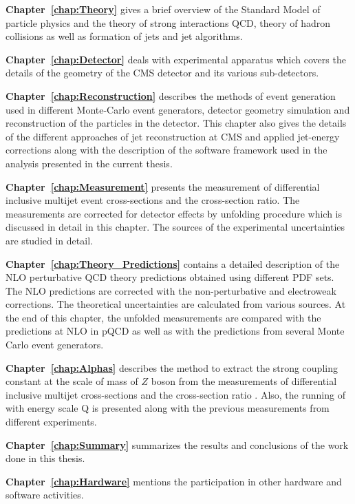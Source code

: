 {\bf Chapter~\ref{chap:Theory}} gives a brief overview of the Standard Model of particle physics and the theory of strong interactions QCD, theory of hadron collisions as well as formation of jets and jet algorithms. 

{\bf Chapter~\ref{chap:Detector}} deals with experimental apparatus which covers the details of the geometry of the CMS detector and its various sub-detectors.

{\bf Chapter~\ref{chap:Reconstruction}} describes the methods of event generation used in different Monte-Carlo event generators, detector geometry simulation and reconstruction of the particles in the detector. This chapter also gives the details of the different approaches of jet reconstruction at CMS and applied jet-energy corrections along with the description of the software framework used in the analysis presented in the current thesis.

{\bf Chapter~\ref{chap:Measurement}} presents the measurement of differential inclusive multijet event cross-sections and the cross-section ratio. The measurements are corrected for detector effects by unfolding procedure which is discussed in detail in this chapter. The sources of the experimental uncertainties are studied in detail. 

{\bf Chapter~\ref{chap:Theory_Predictions}} contains a detailed description of the NLO perturbative QCD theory predictions obtained using different PDF sets. The NLO predictions are corrected with the non-perturbative and electroweak corrections. The theoretical uncertainties are calculated from various sources. At the end of this chapter, the unfolded measurements are compared with the predictions at NLO in pQCD as well as with the predictions from several Monte Carlo event generators.

{\bf Chapter~\ref{chap:Alphas}} describes the method to extract the strong coupling constant at the scale of mass of $Z$ boson \alpsmz from the measurements of differential inclusive multijet cross-sections and the cross-section ratio \ratio. Also, the running of \alps with energy scale Q is presented along with the previous measurements from different experiments.

{\bf Chapter~\ref{chap:Summary}} summarizes the results and conclusions of the work done in this thesis.

{\bf Chapter~\ref{chap:Hardware}} mentions the participation in other hardware and software activities.
